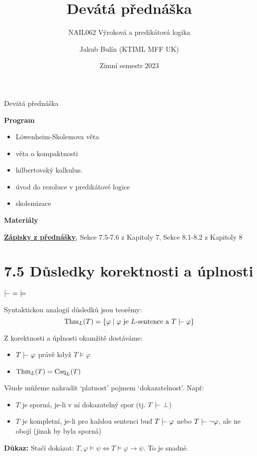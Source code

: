 \documentclass{beamer}
\title{Devátá přednáška}
\subtitle{NAIL062 Výroková a predikátová logika}
\author{Jakub Bulín (KTIML MFF UK)}
\date{Zimní semestr 2023}
\begin{document}
\frame{\titlepage}


\begin{frame}{Devátá přednáška}

    \textbf{Program}
        \begin{itemize}
            \item Löwenheim-Skolemova věta
            \item věta o kompaktnosti
            \item hilbertovský kalkulus.
            \item úvod do rezoluce v predikátové logice
            \item skolemizace
        \end{itemize}

    \textbf{Materiály}

        \href{https://github.com/jbulin-mff-uk/nail062/raw/main/lecture/lecture-notes/lecture-notes.pdf}{\alert{\textbf{Zápisky z přednášky}}}, Sekce 7.5-7.6 z Kapitoly 7, Sekce 8.1-8.2 z Kapitoly 8

\end{frame}


\section{7.5 Důsledky korektnosti a úplnosti}


\begin{frame}{$\proves\ =\ \models$}

    Syntaktickou analogií \alert{důsledků} jsou \alert{teorémy}:
    $$
    \Thm_L(T)=\{\varphi\mid \varphi\text{ je $L$-sentence a } T\proves\varphi\}
    $$
    
    Z korektnosti a úplnosti okamžitě dostáváme:
        \begin{itemize}
            \item $T\proves\varphi$ právě když $T\models\varphi$
            \item $\operatorname{Thm}_L(T)=\operatorname{Csq}_L(T)$
        \end{itemize}
    
    Všude můžeme nahradit `\alert{platnost}' pojmem `\alert{dokazatelnost}'.  Např:
    \begin{itemize}
        \item $T$ je \alert{sporná}, je-li v ní dokazatelný spor (tj. \alert{$T\proves\bot$})
        \item $T$ je \alert{kompletní}, je-li pro každou sentenci buď $T\proves\varphi$ nebo $T\proves\neg\varphi$, ale ne obojí (jinak by byla sporná)
    \end{itemize}


    \textbf{Důkaz:} Stačí dokázat: $T,\varphi\models\psi\Leftrightarrow T\models\varphi\to\psi$. To je snadné.\hfill\qedsymbol

\end{frame}
\end{document}
